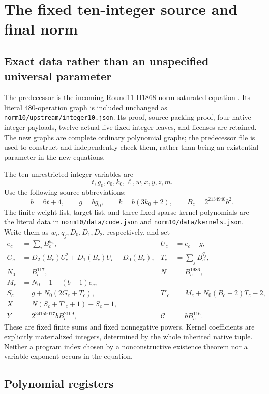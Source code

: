 \documentclass[11pt]{article}
\theoremstyle{definition}
\theoremstyle{remark}
\newcommand{\file}[1]{\nolinkurl{#1}}
\begin{document}
\section{The fixed ten-integer source and final norm}

\subsection{Exact data rather than an unspecified universal parameter}

The predecessor is the incoming Round11 H1868 norm-saturated equation
\cite{round11}. Its literal 480-operation graph is included unchanged as
\file{norm10/upstream/integer10.json}. Its proof, source-packing proof,
four native integer payloads, twelve actual live fixed integer leaves, and
licenses are retained. The new graphs are complete ordinary polynomial
graphs; the predecessor file is used to construct and independently check
them, rather than being an existential parameter in the new equations.

The ten unrestricted integer variables are
\[
 t,g_0,c_0,k_0,\ell,w,x,y,z,m.
\]
Use the following source abbreviations:
\[
 b=6t+4,\qquad g=bg_0,\qquad k=b(3k_0+2),\qquad
 B_c=2^{2134940}b^2.
\]
The finite weight list, target list, and three fixed sparse kernel
polynomials are the literal data in
\file{norm10/data/code.json} and \file{norm10/data/kernels.json}.
Write them as $w_i,q_j,D_0,D_1,D_2$, respectively, and set
\begin{align*}
 e_c&=\sum_i B_c^{w_i},& U_c&=e_c+g,\\
 G_c&=D_2(B_c)U_c^2+D_1(B_c)U_c+D_0(B_c),&
 T_c&=\sum_j B_c^{q_j},\\
 N_0&=B_c^{117},&N&=B_c^{1986},\\
 M_c&=N_0-1-(b-1)e_c,\\
 S_c&=g+N_0(2G_c+T_c),&
 T'_c&=M_c+N_0(B_c-2)T_c-2,\\
 X&=N(S_c+T'_c+1)-S_c-1,\\
 Y&=2^{34159017}b B_c^{2109},&\mathcal C&=bB_c^{116}.
\end{align*}
These are fixed finite sums and fixed nonnegative powers. Kernel
coefficients are explicitly materialized integers, determined by the
whole inherited native tuple. Neither a program index chosen by a
nonconstructive existence theorem nor a variable exponent occurs in the
equation.

\subsection{Polynomial registers}
\end{document}
